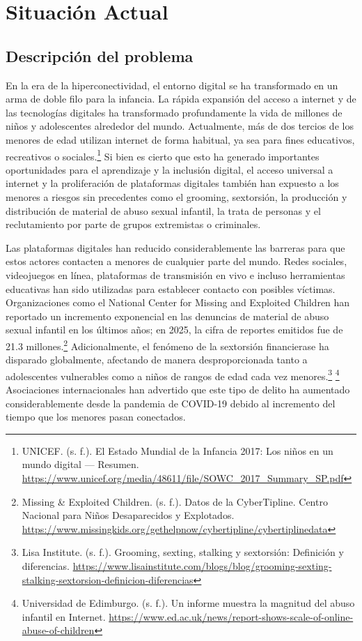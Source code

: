 \section{Situación Actual}

\subsection{Descripción del problema}

En la era de la hiperconectividad, el entorno digital se ha transformado en un arma de doble filo para la infancia. La rápida expansión del acceso a internet y de las tecnologías digitales ha transformado profundamente la vida de millones de niños y adolescentes alrededor del mundo. Actualmente, más de dos tercios de los menores de edad utilizan internet de forma habitual, ya sea para fines educativos, recreativos o sociales.\footnote{UNICEF. (s. f.). El Estado Mundial de la Infancia 2017: Los niños en un mundo digital — Resumen. \url{https://www.unicef.org/media/48611/file/SOWC_2017_Summary_SP.pdf}} Si bien es cierto que esto ha generado importantes oportunidades para el aprendizaje y la inclusión digital, el acceso universal a internet y la proliferación de plataformas digitales también han expuesto a los menores a riesgos sin precedentes como el grooming, sextorsión, la producción y distribución de material de abuso sexual infantil, la trata de personas y el reclutamiento por parte de grupos extremistas o criminales.

Las plataformas digitales han reducido considerablemente las barreras para que estos actores contacten a menores de cualquier parte del mundo. Redes sociales, videojuegos en línea, plataformas de transmisión en vivo e incluso herramientas educativas han sido utilizadas para establecer contacto con posibles víctimas. Organizaciones como el National Center for Missing and Exploited Children han reportado un incremento exponencial en las denuncias de material de abuso sexual infantil en los últimos años; en 2025, la cifra de reportes emitidos fue de 21.3 millones.\footnote{Missing \& Exploited Children. (s. f.). Datos de la CyberTipline. Centro Nacional para Niños Desaparecidos y Explotados. \url{https://www.missingkids.org/gethelpnow/cybertipline/cybertiplinedata}} Adicionalmente, el fenómeno de la sextorsión financierase ha disparado globalmente, afectando de manera desproporcionada tanto a adolescentes vulnerables como a niños de rangos de edad cada vez menores.\footnote{Lisa Institute. (s. f.). Grooming, sexting, stalking y sextorsión: Definición y diferencias. \url{https://www.lisainstitute.com/blogs/blog/grooming-sexting-stalking-sextorsion-definicion-diferencias}} \footnote{Universidad de Edimburgo. (s. f.). Un informe muestra la magnitud del abuso infantil en Internet. \url{https://www.ed.ac.uk/news/report-shows-scale-of-online-abuse-of-children}} Asociaciones internacionales han advertido que este tipo de delito ha aumentado considerablemente desde la pandemia de COVID-19 debido al incremento del tiempo que los menores pasan conectados.

